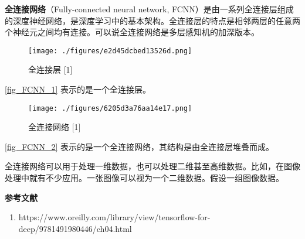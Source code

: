 



\textbf{全连接网络}（Fully-connected neural network, FCNN）是由一系列全连接层组成的深度神经网络，是深度学习中的基本架构。全连接层的特点是相邻两层的任意两个神经元之间均有连接。可以说全连接网络是多层感知机的加深版本。

\begin{figure}[ht]
\centering
\texttt{[image: ./figures/e2d45dcbed13526d.png]}
\caption{全连接层 [1]} \label{fig_FCNN_1}
\end{figure}
\autoref{fig_FCNN_1} 表示的是一个全连接层。

\begin{figure}[ht]
\centering
\texttt{[image: ./figures/6205d3a76aa14e17.png]}
\caption{全连接网络 [1]} \label{fig_FCNN_2}
\end{figure}
\autoref{fig_FCNN_2} 表示的是一个全连接网络，其结构是由全连接层堆叠而成。

全连接网络可以用于处理一维数据，也可以处理二维甚至高维数据。比如，在图像处理中就有不少应用。一张图像可以视为一个二维数据。假设一组图像数据。



\textbf{参考文献}
\begin{enumerate}
\item https://www.oreilly.com/library/view/tensorflow-for-deep/9781491980446/ch04.html
\end{enumerate}
